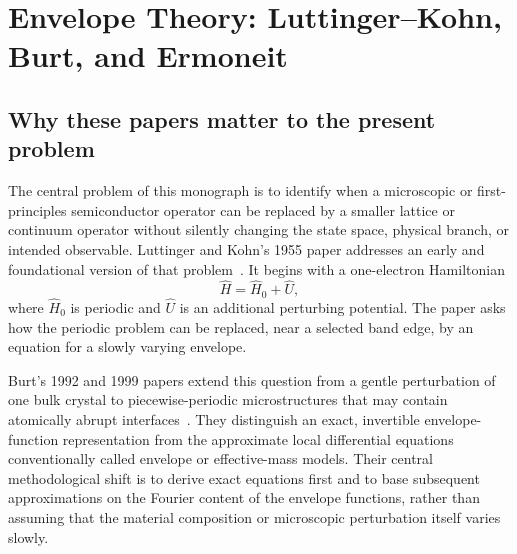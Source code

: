 \chapter[Envelope Theory]{Envelope Theory: Luttinger--Kohn, Burt, and Ermoneit}

\label{app:envelope-theory}


\section{Why these papers matter to the present problem}

The central problem of this monograph is to identify when a microscopic or
first-principles semiconductor operator can be replaced by a smaller lattice or
continuum operator without silently changing the state space, physical branch,
or intended observable. Luttinger and Kohn's 1955 paper addresses an early and
foundational version of that problem~\cite{luttingerKohn1955}. It begins with a
one-electron Hamiltonian
\begin{equation}
  \hat H
  =
  \hat H_0+\hat U,
  \label{eq:lk-parent-perturbation}
\end{equation}
where $\hat H_0$ is periodic and $\hat U$ is an additional perturbing potential.
The paper asks how the periodic problem can be replaced, near a selected band
edge, by an equation for a slowly varying envelope.

Burt's 1992 and 1999 papers extend this question from a gentle perturbation of
one bulk crystal to piecewise-periodic microstructures that may contain
atomically abrupt interfaces~\cite{burt1992,burt1999}. They distinguish an exact,
invertible envelope-function representation from the approximate local
differential equations conventionally called envelope or effective-mass models.
Their central methodological shift is to derive exact equations first and to
base subsequent approximations on the Fourier content of the envelope functions,
rather than assuming that the material composition or microscopic perturbation
itself varies slowly.

